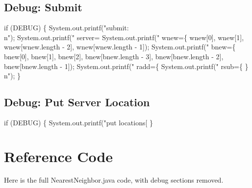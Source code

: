 \subsection{Debug: Submit}

\nwenddocs{}\endmoddef\nwstartdeflinemarkup{}\nwenddeflinemarkup
if (DEBUG) \{
  System.out.printf("submit:\\n");
  System.out.printf("  server=%
  System.out.printf("  wnew=\{ %
      wnew[0], wnew[1], wnew[wnew.length - 2], wnew[wnew.length - 1]);
  System.out.printf("  bnew=\{ %
      bnew[0], bnew[1], bnew[2],
      bnew[bnew.length - 3], bnew[bnew.length - 2], bnew[bnew.length - 1]);
  System.out.printf("  radd=\{ %
  System.out.printf("  rsub=\{ \}\\n");
\}
\nwendcode{}\nwdocspar

\subsection{Debug: Put Server Location}

\nwenddocs{}\endmoddef\nwstartdeflinemarkup{}\nwenddeflinemarkup
if (DEBUG) \{
  System.out.printf("put locations[%
\}
\nwendcode{}\nwdocspar

\section{Reference Code}

Here is the full NearestNeighbor.java code, with debug sections removed.

